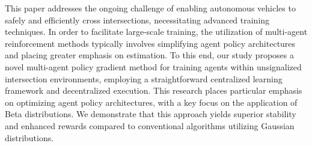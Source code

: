 \begin{e-abstract}
This paper addresses the ongoing challenge of enabling autonomous vehicles to safely and efficiently cross intersections, necessitating advanced training techniques.
In order to facilitate large-scale training, the utilization of multi-agent reinforcement methods typically involves simplifying agent policy architectures and placing greater emphasis on estimation.
To this end, our study proposes a novel multi-agent policy gradient method for training agents within unsignalized intersection environments, employing a straightforward centralized learning framework and decentralized execution.
This research places particular emphasis on optimizing agent policy architectures, with a key focus on the application of Beta distributions.
We demonstrate that this approach yields superior stability and enhanced rewards compared to conventional algorithms utilizing Gaussian distributions.
\end{e-abstract}

